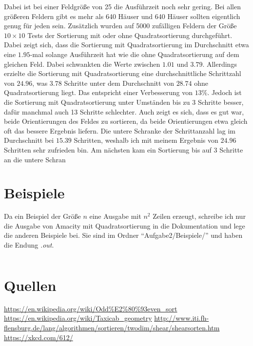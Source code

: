\documentclass[12pt]{article}
\begin{document}
Dabei ist bei einer Feldgröße von 25 die Ausführzeit noch sehr gering. Bei allen größeren Feldern gibt es mehr als 640 Häuser und 640 Häuser sollten eigentlich genug für jeden sein. Zusätzlich wurden auf 5000 zufälligen Feldern der Größe $10\times10$ Tests der Sortierung mit oder ohne Quadratsortierung durchgeführt. Dabei zeigt sich, dass die Sortierung mit Quadratsortierung im Durchschnitt etwa eine $1.95$-mal solange Ausführzeit hat wie die ohne Quadratsortierung auf dem gleichen Feld. Dabei schwankten die Werte zwischen $1.01$ und $3.79$. Allerdings erzielte die Sortierung mit Quadratsortierung eine durchschnittliche Schrittzahl von $24.96$, was $3.78$ Schritte unter dem Durchschnitt von $28.74$ ohne Quadratsortierung liegt. Das entspricht einer Verbesserung von $13\%$. Jedoch ist die Sortierung mit Quadratsortierung unter Umständen bis zu 3 Schritte besser, dafür manchmal auch 13 Schritte schlechter. Auch zeigt es sich, dass es gut war, beide Orientierungen des Feldes zu sortieren, da beide Orientierungen etwa gleich oft das bessere Ergebnis liefern. Die untere Schranke der Schrittanzahl lag im Durchschnitt bei $15.39$ Schritten, weshalb ich mit meinem Ergebnis von $24.96$ Schritten sehr zufrieden bin. Am nächsten kam ein Sortierung bis auf 3 Schritte an die untere Schran
\section{Beispiele}
Da ein Beispiel der Größe $n$ eine Ausgabe mit $n^2$ Zeilen erzeugt, schreibe ich nur die Ausgabe von Amacity mit Quadratsortierung in die Dokumentation und lege die anderen Beispiele bei. Sie sind im Ordner ``Aufgabe2/Beispiele/'' und haben die Endung \textit{.out}.
 \inputminted[breaklines]{bash}{/home/nicholas/informatik/bwinf/Runde2/Aufgabe2/Abgabe/Aufgabe2/Beispiele/drohnen_eingabe_amacity.txt.out}


\section{Quellen}
\begin{thebibliography}{2}
\url{https://en.wikipedia.org/wiki/Odd%E2%80%93even_sort}
\url{https://en.wikipedia.org/wiki/Taxicab_geometry}
\url{http://www.iti.fh-flensburg.de/lang/algorithmen/sortieren/twodim/shear/shearsorten.htm}
\url{https://xkcd.com/612/}
\end{thebibliography}
\end{document}
